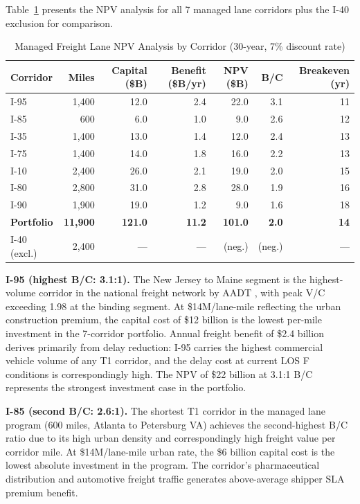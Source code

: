 Table~\ref{tab:npv} presents the NPV analysis for all 7 managed lane corridors plus the I-40 exclusion for comparison.

\begin{table}[h!]
\centering
\caption{Managed Freight Lane NPV Analysis by Corridor (30-year, 7\% discount rate)}
\label{tab:npv}
\begin{tabular}{lrrrrrr}
\toprule
\textbf{Corridor} & \textbf{Miles} & \textbf{Capital (\$B)} & \textbf{Benefit (\$B/yr)} & \textbf{NPV (\$B)} & \textbf{B/C} & \textbf{Breakeven (yr)} \\
\midrule
I-95  & 1,400 & 12.0 & 2.4 & 22.0 & 3.1 & 11 \\
I-85  &   600 &  6.0 & 1.0 &  9.0 & 2.6 & 12 \\
I-35  & 1,400 & 13.0 & 1.4 & 12.0 & 2.4 & 13 \\
I-75  & 1,400 & 14.0 & 1.8 & 16.0 & 2.2 & 13 \\
I-10  & 2,400 & 26.0 & 2.1 & 19.0 & 2.0 & 15 \\
I-80  & 2,800 & 31.0 & 2.8 & 28.0 & 1.9 & 16 \\
I-90  & 1,900 & 19.0 & 1.2 &  9.0 & 1.6 & 18 \\
\midrule
\textbf{Portfolio} & \textbf{11,900} & \textbf{121.0} & \textbf{11.2} & \textbf{101.0} & \textbf{2.0} & \textbf{14} \\
\midrule
I-40 (excl.)  & 2,400 & --- & --- & (neg.) & (neg.) & --- \\
\bottomrule
\end{tabular}
\end{table}

\textbf{I-95 (highest B/C: 3.1:1).} The New Jersey to Maine segment is the highest-volume corridor in the national freight network by AADT \citep{FHWA_HPMS2023}, with peak V/C exceeding 1.98 at the binding segment. At \$14M/lane-mile reflecting the urban construction premium, the capital cost of \$12 billion is the lowest per-mile investment in the 7-corridor portfolio. Annual freight benefit of \$2.4 billion derives primarily from delay reduction: I-95 carries the highest commercial vehicle volume of any T1 corridor, and the delay cost at current LOS F conditions is correspondingly high. The NPV of \$22 billion at 3.1:1 B/C represents the strongest investment case in the portfolio.

\textbf{I-85 (second B/C: 2.6:1).} The shortest T1 corridor in the managed lane program (600 miles, Atlanta to Petersburg VA) achieves the second-highest B/C ratio due to its high urban density and correspondingly high freight value per corridor mile. At \$14M/lane-mile urban rate, the \$6 billion capital cost is the lowest absolute investment in the program. The corridor's pharmaceutical distribution and automotive freight traffic generates above-average shipper SLA premium benefit.


